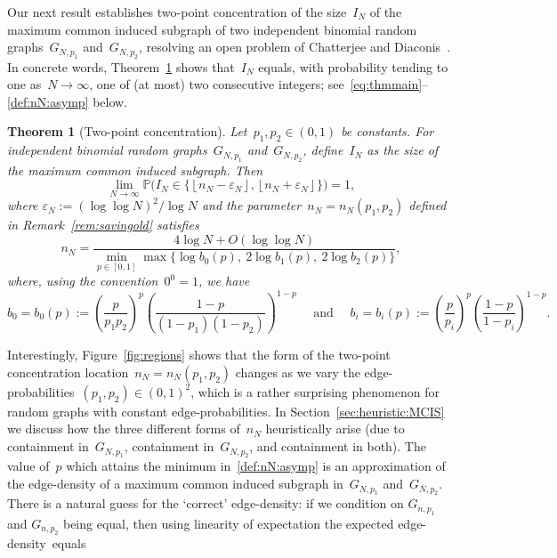 \documentclass{article}
\newcommand{\eps}{\varepsilon}
\renewcommand{\Pr}{\mathbb{P}}
\newcommand\lrpar[1]{\left(#1\right)}
\newcommand\floor[1]{\left\lfloor #1 \right \rfloor}
\newtheorem{thm}{Theorem}
\newcommand\bigpar[1]{\bigl(#1\bigr)}
\newcommand\bigcpar[1]{\bigl\{#1\bigr\}}
\begin{document}
Our next result establishes two-point concentration of the size~$I_N$ of the maximum common induced subgraph of two independent binomial random graphs~$G_{N,p_1}$ and~$G_{N,p_2}$, 
resolving an open problem of Chatterjee and Diaconis~\cite{chatterjee2021isomorphisms}. 
In concrete words, Theorem~\ref{thm:maincommon} shows that~$I_N$ equals, with probability tending to one as~$N \to \infty$, one of (at most) two consecutive integers;  
see~\eqref{eq:thmmain}--\eqref{def:nN:asymp} below.  
\begin{thm}[Two-point concentration]\label{thm:maincommon}Let~$p_1,p_2\in (0,1)$ be constants.  
For independent binomial random graphs~$G_{N,p_1}$ and~$G_{N,p_2}$, define~$I_{N}$ as the size of the maximum common induced subgraph. 
Then 
\begin{equation}\label{eq:thmmain}
\lim_{N \to \infty}\Pr\bigpar{I_N \in \{\floor{n_N-\eps_N}, \floor{n_N+\eps_N}\}} = 1 ,
\end{equation}
where $\eps_N:=(\log \log N)^2/\log N$
and the parameter~$n_N=n_N(p_1,p_2)$  defined in Remark~\ref{rem:savingold} satisfies
\begin{equation}\label{def:nN:asymp}
n_N 
=
\frac{4\log N+O(\log \log N)}{\min_{p\in[0,1]} \max\bigcpar{\log b_0(p), \: 2\log b_1(p), \: 2\log b_2(p)}} ,
\end{equation}
where, using the convention~$0^0=1$, we have
\begin{equation}
\label{def:b}
{b_0} = {b_0}(p):= \lrpar{\frac{p}{p_1p_2}}^p \lrpar{\frac{1-p}{ (1-p_1)(1-p_2)}}^{1-p}
\quad \text{ and } \quad 
b_i = b_i(p) := \lrpar{\frac{p}{p_i}}^p \lrpar{\frac{1-p}{ 1-p_i}}^{1-p}.
\end{equation}
\end{thm}
Interestingly, Figure~\ref{fig:regions} shows that the form of the two-point concentration location~$n_N=n_N(p_1,p_2)$ changes as we vary the edge-probabilities~$(p_1,p_2) \in (0,1)^2$, 
which is a rather surprising  phenomenon for random graphs with constant edge-probabilities. 
In Section~\ref{sec:heuristic:MCIS} we discuss how the three different forms of~$n_N$ heuristically arise (due to containment in~$G_{N,p_1}$, containment in~$G_{N,p_2}$, and containment in both).  
The value of~$p$ which attains the minimum in~\eqref{def:nN:asymp} is an approximation of the edge-density of a maximum common induced subgraph in~$G_{N,p_1}$ and~$G_{N,p_2}$. 
There is a natural guess for the `correct' edge-density: if we condition on $G_{n,p_1}$ and $G_{n,p_2}$ being equal, then using linearity of expectation the expected edge-density~equals
\end{document}
